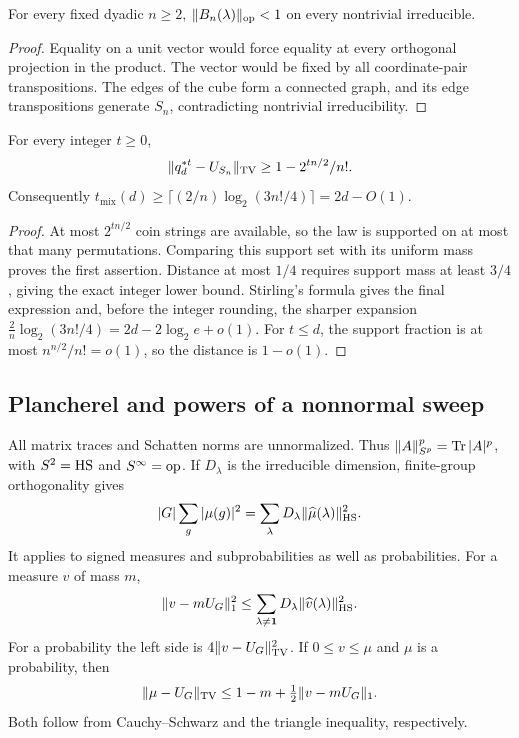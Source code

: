 \begin{lemma}\label{lem:finitegap}
For every fixed dyadic $n\ge2$, $\|B_n(\lambda)\|_{\mathrm{op}}<1$ on every nontrivial irreducible.
\end{lemma}
\begin{proof}
Equality on a unit vector would force equality at every orthogonal projection in the product. The vector would be fixed by all coordinate-pair transpositions. The edges of the cube form a connected graph, and its edge transpositions generate $S_n$, contradicting nontrivial irreducibility.
\end{proof}


\begin{lemma}\label{lem:support}\label{ten:support}
For every integer $t\ge0$,
\[
 \|q_d^{*t}-U_{S_n}\|_{\mathrm{TV}}\ge1-2^{tn/2}/n!.
\]
Consequently $t_{\mathrm{mix}}(d)\ge\lceil(2/n)\log_2(3n!/4)\rceil=2d-O(1)$.
\end{lemma}
\begin{proof}
At most $2^{tn/2}$ coin strings are available, so the law is supported on at most that many permutations. Comparing this support set with its uniform mass proves the first assertion. Distance at most $1/4$ requires support mass at least $3/4$, giving the exact integer lower bound. Stirling's formula gives the final expression and, before the integer
rounding, the sharper expansion
$\frac2n\log_2(3n!/4)=2d-2\log_2 e+o(1)$.
For $t\le d$, the support fraction is at most $n^{n/2}/n!=o(1)$,
so the distance is $1-o(1)$.
\end{proof}

\subsection{Plancherel and powers of a nonnormal sweep}
All matrix traces and Schatten norms are unnormalized. Thus $\|A\|_{S^p}^p=\operatorname{Tr}|A|^p$, with $S^2=\mathrm{HS}$ and $S^\infty=\mathrm{op}$. If $D_\lambda$ is the irreducible dimension, finite-group orthogonality gives
\[
 |G|\sum_g|\mu(g)|^2=\sum_\lambda D_\lambda\|\widehat\mu(\lambda)\|_{\mathrm{HS}}^2.
\]
It applies to signed measures and subprobabilities as well as probabilities. For a measure $v$ of mass $m$,
\begin{equation}\label{eq:plancherel}
 \|v-mU_G\|_1^2\le
 \sum_{\lambda\ne\mathbf1}D_\lambda\|\widehat v(\lambda)\|_{\mathrm{HS}}^2.
\end{equation}
For a probability the left side is $4\|v-U_G\|_{\mathrm{TV}}^2$. If $0\le v\le\mu$ and $\mu$ is a probability, then
\begin{equation}\label{eq:lostmass}
 \|\mu-U_G\|_{\mathrm{TV}}\le1-m+\tfrac12\|v-mU_G\|_1.
\end{equation}
Both follow from Cauchy--Schwarz and the triangle inequality, respectively.

